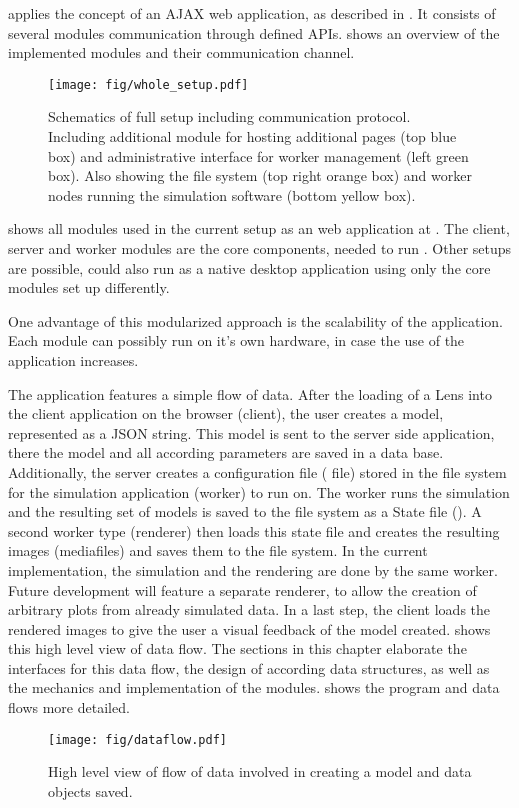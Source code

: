 

\spl applies the concept of an AJAX web application, as described in .
It consists of several modules communication through defined APIs.
 shows an overview of the implemented modules and their communication channel.

\begin{figure}[htbp]
  \centering
    \texttt{[image: fig/whole\_setup.pdf]}
  \caption{Schematics of full \spl setup including communication protocol. Including additional module for hosting additional pages (top blue box) and administrative interface for worker management (left green box). Also showing the file system (top right orange box) and worker nodes running the simulation software (bottom yellow box).}
  \label{fig:whole_setup}
\end{figure}


 shows all modules used in the current setup as an web application at \splurl.
The client, server and worker modules are the core components, needed to run \spl.
Other setups are possible, \spl could also run as a native desktop application using only the core modules set up differently.

One advantage of this modularized approach is the scalability of the application.
Each module can possibly run on it's own hardware, in case the use of the application increases.

The application features a simple flow of data.
After the loading of a Lens into the client application on the browser (client), the user creates a model, represented as a JSON string.
This model is sent to the server side application, there the model and all according parameters are saved in a data base.
Additionally, the server creates a configuration file ( file) stored in the file system for the simulation application (worker) to run on.
The worker runs the simulation and the resulting set of models is saved to the file system as a State file ().
A second worker type (renderer) then loads this state file and creates the resulting images (mediafiles) and saves them to the file system.
In the current implementation, the simulation and the rendering are done by the same worker.
Future development will feature a separate renderer, to allow the creation of arbitrary plots from already simulated data.
In a last step, the client loads the rendered images to give the user a visual feedback of the model created.
 shows this high level view of data flow.
The sections in this chapter elaborate the interfaces for this data flow, the design of according data structures, as well as the mechanics and implementation of the modules.
 shows the program and data flows more detailed.

\begin{figure}[htbp]
  \centering
    \texttt{[image: fig/dataflow.pdf]}
  \caption{High level view of flow of data involved in creating a model and data objects saved.}
  \label{fig:dataflow}
\end{figure}



